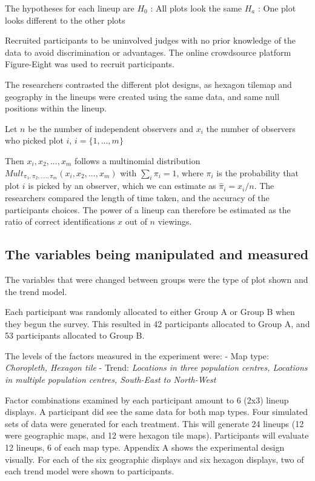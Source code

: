 \documentclass[conference,final,]{IEEEtran}
\begin{document}
The hypotheses for each lineup are \(H_0\) : All plots look the same
\(H_a\) : One plot looks different to the other plots

Recruited participants to be uninvolved judges with no prior knowledge
of the data to avoid discrimination or advantages. The online
crowdsource platform Figure-Eight was used to recruit participants.

The researchers contrasted the different plot designs, as hexagon
tilemap and geography in the lineups were created using the same data,
and same null positions within the lineup.

Let \(n\) be the number of independent observers and \(x_i\) the number
of observers who picked plot \(i\), \(i = \{1,...,m\}\)

Then \(x_i, x_2, ..., x_m\) follows a multinomial
distribution\(Mult_{\pi_1, \pi_2, ...., \pi_m}(x_i, x_2, ..., x_m)\)
with \(\sum_i \pi_i = 1\), where \(\pi_i\) is the probability that plot
\(i\) is picked by an observer, which we can estimate as
\(\hat{\pi}_i = x_i/n\). The researchers compared the length of time
taken, and the accuracy of the participants choices. The power of a
lineup can therefore be estimated as the ratio of correct
identifications \(x\) out of \(n\) viewings.

\hypertarget{the-variables-being-manipulated-and-measured}{%
\subsection{The variables being manipulated and
measured}\label{the-variables-being-manipulated-and-measured}}

The variables that were changed between groups were the type of plot
shown and the trend model.

Each participant was randomly allocated to either Group A or Group B
when they begun the survey. This resulted in 42 participants allocated
to Group A, and 53 participants allocated to Group B.

The levels of the factors measured in the experiment were: - Map type:
\emph{Choropleth, Hexagon tile} - Trend: \emph{Locations in three
population centres, Locations in multiple population centres, South-East
to North-West}

Factor combinations examined by each participant amount to 6 (2x3)
lineup displays. A participant did see the same data for both map types.
Four simulated sets of data were generated for each treatment. This will
generate 24 lineups (12 were geographic maps, and 12 were hexagon tile
maps). Participants will evaluate 12 lineups, 6 of each map type.
Appendix A shows the experimental design visually. For each of the six
geographic displays and six hexagon displays, two of each trend model
were shown to participants.
\end{document}
